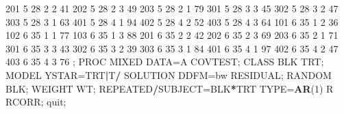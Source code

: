 \documentclass[]{book}
\newenvironment{Shaded}{\begin{snugshade}}{\end{snugshade}}
\newcommand{\DecValTok}[1]{\textcolor[rgb]{0.00,0.00,0.81}{#1}}
\newcommand{\KeywordTok}[1]{\textcolor[rgb]{0.13,0.29,0.53}{\textbf{#1}}}
\newcommand{\NormalTok}[1]{#1}
\newcommand{\OperatorTok}[1]{\textcolor[rgb]{0.81,0.36,0.00}{\textbf{#1}}}
\newcommand{\StringTok}[1]{\textcolor[rgb]{0.31,0.60,0.02}{#1}}
\begin{document}
\begin{Shaded}
\begin{Highlighting}[]
\DecValTok{201} \DecValTok{5}   \DecValTok{28}  \DecValTok{2}   \DecValTok{2}   \DecValTok{41}
\DecValTok{202} \DecValTok{5}   \DecValTok{28}  \DecValTok{2}   \DecValTok{3}   \DecValTok{49}
\DecValTok{203} \DecValTok{5}   \DecValTok{28}  \DecValTok{2}   \DecValTok{1}   \DecValTok{79}
\DecValTok{301} \DecValTok{5}   \DecValTok{28}  \DecValTok{3}   \DecValTok{3}   \DecValTok{45}
\DecValTok{302} \DecValTok{5}   \DecValTok{28}  \DecValTok{3}   \DecValTok{2}   \DecValTok{47}
\DecValTok{303} \DecValTok{5}   \DecValTok{28}  \DecValTok{3}   \DecValTok{1}   \DecValTok{63}
\DecValTok{401} \DecValTok{5}   \DecValTok{28}  \DecValTok{4}   \DecValTok{1}   \DecValTok{94}
\DecValTok{402} \DecValTok{5}   \DecValTok{28}  \DecValTok{4}   \DecValTok{2}   \DecValTok{52}
\DecValTok{403} \DecValTok{5}   \DecValTok{28}  \DecValTok{4}   \DecValTok{3}   \DecValTok{64}
\DecValTok{101} \DecValTok{6}   \DecValTok{35}  \DecValTok{1}   \DecValTok{2}   \DecValTok{36}
\DecValTok{102} \DecValTok{6}   \DecValTok{35}  \DecValTok{1}   \DecValTok{1}   \DecValTok{77}
\DecValTok{103} \DecValTok{6}   \DecValTok{35}  \DecValTok{1}   \DecValTok{3}   \DecValTok{88}
\DecValTok{201} \DecValTok{6}   \DecValTok{35}  \DecValTok{2}   \DecValTok{2}   \DecValTok{42}
\DecValTok{202} \DecValTok{6}   \DecValTok{35}  \DecValTok{2}   \DecValTok{3}   \DecValTok{69}
\DecValTok{203} \DecValTok{6}   \DecValTok{35}  \DecValTok{2}   \DecValTok{1}   \DecValTok{71}
\DecValTok{301} \DecValTok{6}   \DecValTok{35}  \DecValTok{3}   \DecValTok{3}   \DecValTok{43}
\DecValTok{302} \DecValTok{6}   \DecValTok{35}  \DecValTok{3}   \DecValTok{2}   \DecValTok{39}
\DecValTok{303} \DecValTok{6}   \DecValTok{35}  \DecValTok{3}   \DecValTok{1}   \DecValTok{84}
\DecValTok{401} \DecValTok{6}   \DecValTok{35}  \DecValTok{4}   \DecValTok{1}   \DecValTok{97}
\DecValTok{402} \DecValTok{6}   \DecValTok{35}  \DecValTok{4}   \DecValTok{2}   \DecValTok{47}
\DecValTok{403} \DecValTok{6}   \DecValTok{35}  \DecValTok{4}   \DecValTok{3}   \DecValTok{76}
\NormalTok{;}
\NormalTok{PROC MIXED DATA=A COVTEST;}
\NormalTok{CLASS BLK TRT;}
\NormalTok{MODEL YSTAR=TRT}\OperatorTok{|}\NormalTok{T}\OperatorTok{/}\StringTok{ }\NormalTok{SOLUTION DDFM=bw RESIDUAL;}
\NormalTok{RANDOM BLK;}
\NormalTok{WEIGHT WT;}
\NormalTok{REPEATED}\OperatorTok{/}\NormalTok{SUBJECT=BLK}\OperatorTok{*}\NormalTok{TRT TYPE=}\KeywordTok{AR}\NormalTok{(}\DecValTok{1}\NormalTok{) R RCORR;}
\NormalTok{quit;}


\end{Highlighting}
\end{Shaded}
\end{document}
